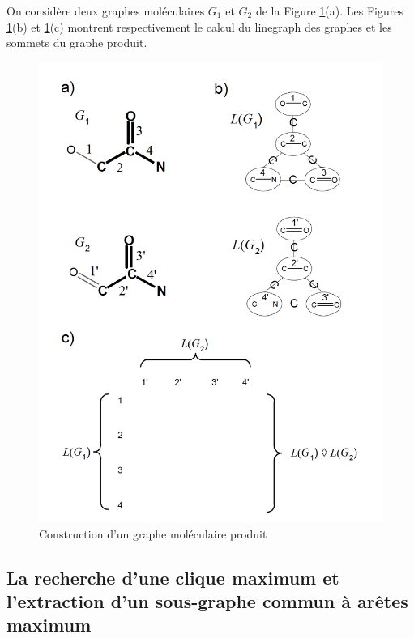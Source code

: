 \begin{exemple}
On considère deux graphes moléculaires $G_1$ et $G_2$ de la Figure \ref{produit}(a). Les Figures  \ref{produit}(b) et \ref{produit}(c) montrent respectivement le calcul du linegraph des graphes  et les sommets du graphe produit.

\begin{figure}[H]
\label{produit}
\begin{center}
\includegraphics[scale=0.65]{produit.png}
\caption{Construction d'un graphe moléculaire produit}
\end{center}
\end{figure}
\end{exemple}

\subsection{La recherche d'une clique maximum et l'extraction d'un sous-graphe commun à arêtes maximum}


